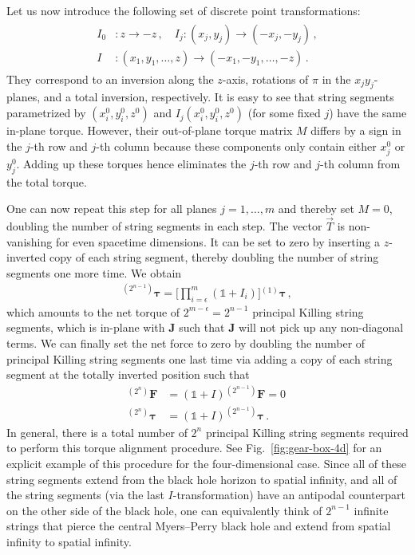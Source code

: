 \documentclass[superscriptaddress,twocolumn,showpacs,
preprintnumbers,amsmath,amssymb,nofootinbib,
longbibliography,aps,prd,10pt]{revtex4-1}
\newcommand{\ts}[1]{{\boldsymbol{#1}}}         %
\begin{document}
Let us now introduce the following set of discrete point transformations:
\begin{align}
\begin{split}
\label{eq:discrete-transformations}
I_0 &: z \rightarrow -z \, , \quad I_j : (x_j, y_j) \rightarrow (-x_j, -y_j) \, , \\
I &: (x_1, y_1, \dots, z) \rightarrow (-x_1, -y_1, \dots, -z) \, .
\end{split}
\end{align}
They correspond to an inversion along the $z$-axis, rotations of $\pi$ in the $x_j y_j$-planes, and a total inversion, respectively. It is easy to see that string segments parametrized by $(x_i^0, y_i^0, z^0)$ and $I_j (x_i^0, y_i^0, z^0)$ (for some fixed $j$) have the same in-plane torque. However, their out-of-plane torque matrix $M$ differs by a sign in the $j$-th row and $j$-th column because these components only contain either $x^0_j$ or $y^0_j$. Adding up these torques hence eliminates the $j$-th row and $j$-th column from the total torque.

One can now repeat this step for all planes $j=1,\dots,m$ and thereby set $M=0$, doubling the number of string segments in each step. The vector $\vec{T}$ is non-vanishing for even spacetime dimensions. It can be set to zero by inserting a $z$-inverted copy of each string segment, thereby doubling the number of string segments one more time. We obtain
\begin{align}
{}^{(2^{n-1})}\ts{\tau} = \Big[ \prod\limits_{i=\epsilon}^m \left( \mathbb{1} + I_i \right) \Big] {}^{(1)}\ts{\tau} \, ,
\end{align}
which amounts to the net torque of $2^{m-\epsilon} = 2^{n-1}$ principal Killing string segments, which is in-plane with $\ts{J}$ such that $\ts{J}$ will not pick up any non-diagonal terms. We can finally set the net force to zero by doubling the number of principal Killing string segments one last time via adding a copy of each string segment at the totally inverted position such that
\begin{align}
{}^{(2^n)}\ts{F} &= (\mathbb{1} + I) {}^{(2^{n-1})} \ts{F} = 0 \, \\
{}^{(2^n)}\ts{\tau} &= (\mathbb{1} + I) {}^{(2^{n-1})} \ts{\tau} \, .
\end{align}
In general, there is a total number of $2^n$ principal Killing string segments required to perform this torque alignment procedure. See Fig.~\ref{fig:gear-box-4d} for an explicit example of this procedure for the four-dimensional case. Since all of these string segments extend from the black hole horizon to spatial infinity, and all of the string segments (via the last $I$-transformation) have an antipodal counterpart on the other side of the black hole, one can equivalently think of $2^{n-1}$ infinite strings that pierce the central Myers--Perry black hole and extend from spatial infinity to spatial infinity.
\end{document}
